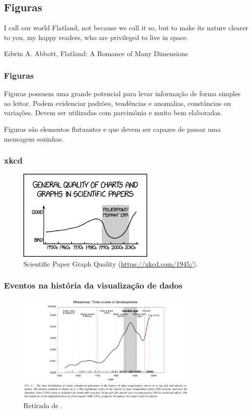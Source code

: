 \subsection{Figuras}

\begin{frame}
\epigraph{I call our world Flatland, not because we call it so, 
but to make its nature clearer to you, my happy readers, 
who are privileged to live in space.}{Edwin A. Abbott, Flatland: A Romance of Many Dimensions}
\end{frame}


\begin{frame}
\frametitle{Figuras}
Figuras possuem uma grande potencial para levar informação de forma simples ao leitor.
Podem evidenciar padrões, tendências e anomalias, constâncias ou variações. 
Devem ser utilizadas com parcimônia e muito bem elaboradas.

\vspace{3ex}
Figuras são elementos flutuantes e que devem ser capazes de passar uma mensagem sozinhas.
\end{frame}


\begin{frame}
\frametitle{xkcd}
\begin{figure}[h]
\centering
\includegraphics[width=0.6\textwidth,height=0.6\textheight,keepaspectratio]{figures/scientific_paper_graph_quality.png}
\caption{Scientific Paper Graph Quality (\url{https://xkcd.com/1945/}).}
\label{fig-scientific_paper_graph_quality}
\end{figure}
\end{frame}

\begin{frame}
\frametitle{Eventos na história da visualização de dados}
\begin{figure}[h]
\centering
\includegraphics[width=0.8\textwidth,height=0.8\textheight,keepaspectratio]{figures/hist_data_visualization.png}
\caption{Retirada de \textcite{Friendly2008}.}
\label{fig-hist_data_visualization}
\end{figure}
\end{frame}


